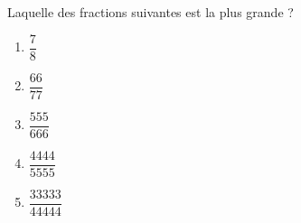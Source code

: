 Laquelle des fractions suivantes est la plus grande ?
\begin{multicols}{5}
  \begin{enumerate}[A/]
  \item $\dfrac78$
  \item $\dfrac{66}{77}$
  \item $\dfrac{555}{666}$
  \item $\dfrac{4444}{5555}$
  \item $\dfrac{33333}{44444}$
  \end{enumerate}
\end{multicols}